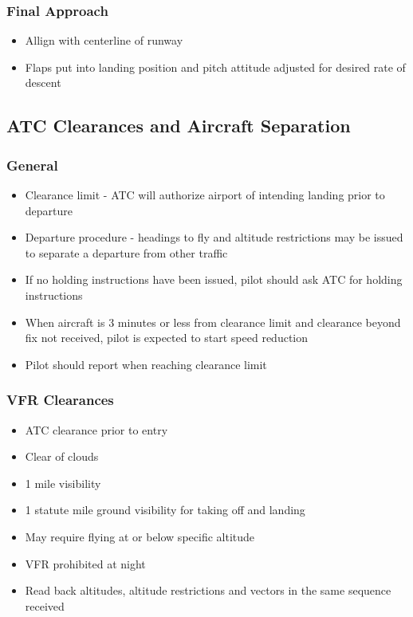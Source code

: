 \documentclass{article}
\begin{document}
\subsubsection*{Final Approach}
\begin{itemize}
\item Allign with centerline of runway
\item Flaps put into landing position and pitch attitude adjusted for desired rate of descent 
\end{itemize}

\subsection{ATC Clearances and Aircraft Separation}

\subsubsection*{General}
\begin{itemize}
\item Clearance limit - ATC will authorize airport of intending landing prior to departure
\item Departure procedure - headings to fly and altitude restrictions may be issued to separate a departure from other traffic
\item If no holding instructions have been issued, pilot should ask ATC for holding instructions
\item When aircraft is 3 minutes or less from clearance limit and clearance beyond fix not received, pilot is expected to start speed reduction
\item Pilot should report when reaching clearance limit
\end{itemize}

\subsubsection*{VFR Clearances}

\begin{itemize}
\item ATC clearance prior to entry
\item Clear of clouds
\item 1 mile visibility
\item 1 statute mile ground visibility for taking off and landing
\item May require flying at or below specific altitude
\item VFR prohibited at night
\item Read back altitudes, altitude restrictions and vectors in the same sequence received
\end{itemize}
\end{document}
